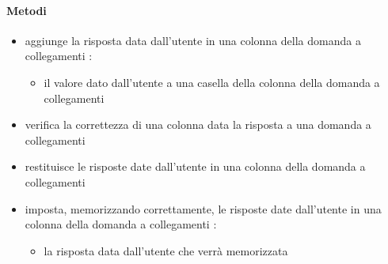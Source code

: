 \paragraph{Metodi}
\begin{itemize}
\item {}
\newline
aggiunge la risposta data dall'utente in una colonna della domanda a collegamenti
\newline
{} :
\begin{itemize}
\item {}
\newline
il valore dato dall'utente a una casella della colonna della domanda a collegamenti
\end{itemize}
\item {}
\newline
verifica la correttezza di una colonna data la risposta a una domanda a collegamenti
\newline
\item {}
\newline
restituisce le risposte date dall'utente in una colonna della domanda a collegamenti
\newline
\item {}
\newline
imposta, memorizzando correttamente, le risposte date dall'utente in una colonna della domanda a collegamenti
\newline
{} :
\begin{itemize}
\item {}
\newline
la risposta data dall'utente che verrà memorizzata
\end{itemize}
\end{itemize}
